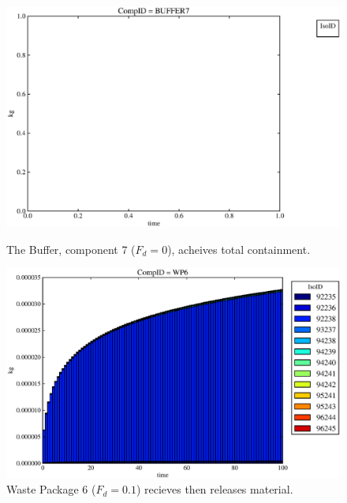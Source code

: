 \begin{figure}[ht]
\begin{minipage}[b]{0.45\linewidth}
  \includegraphics[width=\textwidth]{./chapters/demonstration/no_release/lpEMII3.eps}
  \caption[Case LPEMII Buffer Contaminants]{
    The Buffer, component 7 ($F_d=0$), acheives total containment.
    }
  \label{fig:lpEMIIbuff}

\end{minipage}
\hspace{0.05\linewidth}
\begin{minipage}[b]{0.45\linewidth}
  \includegraphics[width=\textwidth]{./chapters/demonstration/no_release/lpEMII2.eps}
  \caption[Case LPEMII Waste Package Contaminants.]{ 
    Waste Package 6 ($F_d = 0.1$) recieves then releases material. 
    }
  \label{fig:lpEMIIwp6}


\end{minipage}
\end{figure}
